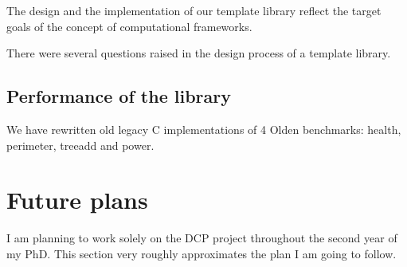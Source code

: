 \documentclass[10pt,a4paper]{report}
\begin{document}
\quad The design and the implementation of our template library reflect the target goals of the concept of computational frameworks.    

\quad There were several questions raised in the design process of a template library. 

\section{Performance of the library}
\quad We have rewritten old legacy C implementations of 4 Olden benchmarks: health, perimeter, treeadd and power. 

\chapter{Future plans}
\quad I am planning to work solely on the DCP project throughout the second year of my PhD. This section very roughly approximates the plan I am going to follow.
\end{document}
